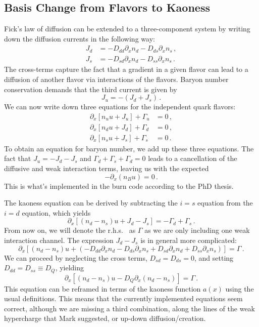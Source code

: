 \documentclass[11pt]{article}
\newcommand{\p}{\partial}
\begin{document}
\subsection{Basis Change from Flavors to Kaoness}

Fick's law of diffusion can be extended to a three-component system by writing down the diffusion currents in the following way:
\begin{align}
    J_d&= -D_{dd}\p_xn_d-D_{ds}\p_xn_s \, , \\
    J_s&=-D_{sd}\p_xn_d-D_{ss}\p_xn_s \, .
\end{align}
The cross-terms capture the fact that a gradient in a given flavor can lead to a diffusion of another flavor via interactions of the flavors. Baryon number conservation demands that the third current is given by
\begin{equation}
    J_u=-\left(J_d+J_s \right) \, .
\end{equation}
We can now write down three equations for the independent quark flavors:
\begin{align}
    \p_x\left[n_uu+J_u\right]+\Gamma_u&=0 \, ,\\
    \p_x\left[n_du+J_d\right]+\Gamma_d&=0 \, ,\\
    \p_x\left[n_su+J_s\right]+\Gamma_s&=0 \, .
\end{align}
To obtain an equation for baryon number, we add up these three equations. The fact that $J_u=-J_d-J_s$ and $\Gamma_d+\Gamma_s+\Gamma_d=0$ leads to a cancellation of the diffusive and weak interaction terms, leaving us with the expected
\begin{equation}
    -\p_x\left(n_Bu\right)=0 \, .
\end{equation}
This is what's implemented in the burn code according to the PhD thesis.

The kaoness equation can be derived by subtracting the $i=s$ equation from the $i=d$ equation, which yields
\begin{equation}
    \p_x\left[(n_d-n_s)u+J_d-J_s \right]=-\Gamma_d+\Gamma_s \, .
\end{equation}
From now on, we will denote the r.h.s.~ as $\Gamma$ as we are only including one weak interaction channel.
The expression $J_d-J_s$ is in general more complicated:
\begin{equation}
    \p_x\left[(n_d-n_s)u+\left(-D_{dd}\p_xn_d-D_{ds}\p_xn_s+D_{sd}\p_xn_d+D_{ss}\p_xn_s \right) \right]=\Gamma \, .
\end{equation}
We can proceed by neglecting the cross terms, $D_{sd}=D_{ds}=0$, and setting $D_{dd}=D_{ss}\equiv D_Q$, yielding
\begin{equation}
    \p_x\left[(n_d-n_s)u-D_Q\p_x(n_d-n_s)\right]=\Gamma \, .
\end{equation}
This equation can be reframed in terms of the kaoness function $a(x)$ using the usual definitions.
This means that the currently implemented equations seem correct, although we are missing a third combination, along the lines of the weak hypercharge that Mark suggested, or up-down diffusion/creation.
\end{document}
